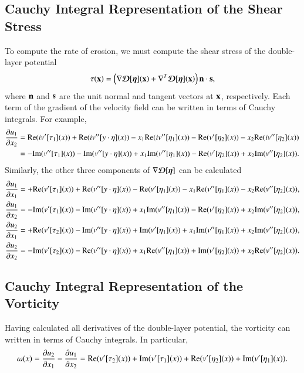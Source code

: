 \documentclass[preprint, 10pt]{elsarticle}
\begin{document}
\subsection{Cauchy Integral Representation of the Shear Stress}
To compute the rate of erosion, we must compute the shear stress of the
double-layer potential
\begin{align}
  \tau(\xx) = \left(\nabla \DDD[\eeta](\xx) + 
    \nabla^T \DDD[\eeta](\xx) \right) \nn \cdot \ss,
\end{align} where $\nn$ and $\ss$ are the unit normal and tangent
vectors at $\xx$, respectively.  Each term of the gradient of the
velocity field can be written in terms of Cauchy integrals.  For
example,
\begin{align}
  \pderiv{u_1}{x_2} &= \Re(iv'[\tau_1](x)) + 
      \Re(i v''[y \cdot \eta](x)) -
      x_1\Re(i v''[\eta_1](x))  -
      \Re(v'[\eta_2](x)) - x_2 \Re(iv''[\eta_2](x)) \\
    &= -\Im(v''[\tau_1](x)) - 
      \Im(v''[y \cdot \eta](x)) +
      x_1\Im(v''[\eta_1](x)) -
      \Re(v'[\eta_2](x)) + x_2 \Im(v''[\eta_2](x)).
\end{align}
Similarly, the other three components of $\nabla \DDD[\eeta]$ can be
calculated
\begin{align}
  \pderiv{u_1}{x_1} &= +\Re (v'[\tau_1](x)) + 
    \Re (v''[y\cdot\eta](x)) - \Re (v'[\eta_1](x)) - 
    x_1\Re (v''[\eta_1](x)) - x_2\Re (v''[\eta_2](x)), \\
  \pderiv{u_1}{x_2} &= - \Im (v'[\tau_1](x)) - 
    \Im (v''[y\cdot\eta](x)) + x_1\Im (v''[\eta_1](x)) - 
    \Re (v'[\eta_2](x)) + x_2\Im (v''[\eta_2](x)), \\
  \pderiv{u_2}{x_1} &= +\Re (v'[\tau_2](x)) - 
    \Im (v''[y\cdot\eta](x)) + \Im (v'[\eta_1](x)) +
    x_1\Im (v''[\eta_1](x)) + x_2\Im (v''[\eta_2](x)), \\
  \pderiv{u_2}{x_2} &= -\Im (v'[\tau_2](x)) - 
    \Re (v''[y\cdot\eta](x)) + x_1\Re (v''[\eta_1](x)) +
    \Im (v'[\eta_2](x)) + x_2\Re (v''[\eta_2](x)).
\end{align}

\subsection{Cauchy Integral Representation of the Vorticity}
Having calculated all derivatives of the double-layer potential, the
vorticity can written in terms of Cauchy integrals.  In particular,
\begin{align}
  \omega(x) = \pderiv{u_2}{x_1} - \pderiv{u_1}{x_2} = 
\Re (v'[\tau_2](x)) + \Im (v'[\tau_1](x)) 
 + \Re (v'[\eta_2](x))+ \Im (v'[\eta_1](x)).
\end{align}
\end{document}
